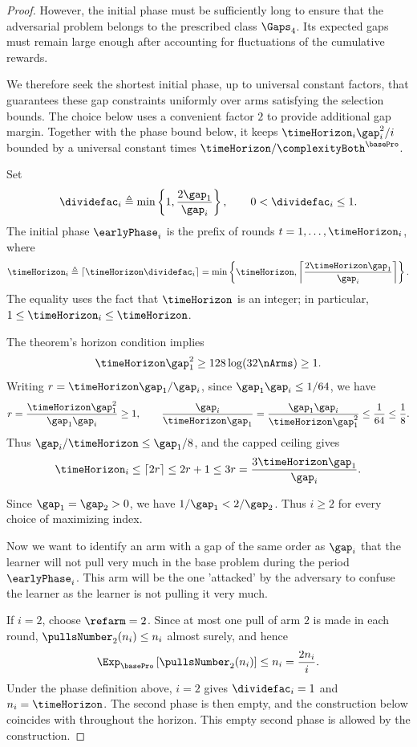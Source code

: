 \begin{proof}
However, the initial phase must be sufficiently long to ensure that
the adversarial problem belongs to the prescribed class $\Gaps_4$.
Its expected gaps must remain large enough after accounting for
fluctuations of the cumulative rewards.

We therefore seek the shortest initial phase, up to universal constant
factors, that guarantees these gap constraints uniformly over arms
satisfying the selection bounds. The choice below uses a convenient
factor $2$ to provide additional gap margin. Together with the phase
bound below, it keeps $\timeHorizon_i\gap_i^2/i$ bounded by a universal
constant times $\timeHorizon/\complexityBoth^{\basePro}$.

Set
\[
\dividefac_i\triangleq\min\left\{1,\frac{2\gap_1}{\gap_i}\right\},
\qquad 0<\dividefac_i\leq1.
\]
The initial phase $\earlyPhase_i$ is the prefix of rounds
$t=1,\ldots,\timeHorizon_i$, where
\[
\timeHorizon_i\triangleq\left\lceil\timeHorizon\dividefac_i\right\rceil
=\min\left\{\timeHorizon,
\left\lceil\frac{2\timeHorizon\gap_1}{\gap_i}\right\rceil\right\}.
\]
The equality uses the fact that $\timeHorizon$ is an integer;
in particular, $1\leq\timeHorizon_i\leq\timeHorizon$.

The theorem's horizon condition implies
\[
\timeHorizon\gap_1^2\geq128\log(32\nArms)\geq1.
\]
Writing $r=\timeHorizon\gap_1/\gap_i$, since
$\gap_1\gap_i\leq1/64$, we have
\[
r=\frac{\timeHorizon\gap_1^2}{\gap_1\gap_i}\geq1,
\qquad
\frac{\gap_i}{\timeHorizon\gap_1}
=\frac{\gap_1\gap_i}{\timeHorizon\gap_1^2}
\leq\frac{1}{64}\leq\frac18.
\]
Thus $\gap_i/\timeHorizon\leq\gap_1/8$, and the capped ceiling gives
\[
\timeHorizon_i\leq\lceil2r\rceil\leq2r+1\leq3r
=\frac{3\timeHorizon\gap_1}{\gap_i}.
\]

 
Since $\gap_1=\gap_2>0$, we have $1/\gap_1<2/\gap_2$.
Thus $i\geq2$ for every choice of maximizing index.

	Now we want to identify an arm with a gap of the same order as $\gap_i$ that the 
	learner will not pull
	very much in the base problem \basePro{}
	during the period~$\earlyPhase_i$. This arm will be the one 'attacked' by the adversary to confuse the learner as the learner is not pulling it very much.


If $i=2$, choose $\refarm=2$. Since at most one pull of arm $2$
is made in each round, $\pullsNumber_2(n_i)\leq n_i$ almost surely,
and hence
\[
\Exp_{\basePro}\left[\pullsNumber_2(n_i)\right]
\leq n_i=\frac{2n_i}{i}.
\]
Under the phase definition above, $i=2$ gives $\dividefac_i=1$
and $n_i=\timeHorizon$.
The second phase is then empty, and the \advPro{} construction below
coincides with \basePro{} throughout the horizon. This empty second
phase is allowed by the construction.


\end{proof}
